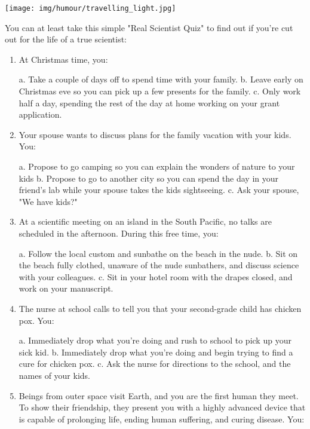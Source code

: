 	\begin{center}\underline{\hspace{5 cm}}\end{center}
		\begin{center}
		\texttt{[image: img/humour/travelling\_light.jpg]}	
	\end{center}

\pagebreak
You can at least take this simple "Real Scientist Quiz" to find out if you're cut out for the life of a true scientist:
\begin{enumerate}
	\item At Christmas time, you: 

a. Take a couple of days off to spend time with your family.
b. Leave early on Christmas eve so you can pick up a few presents for the family. 
c. Only work half a day, spending the rest of the day at home working on your grant application. 

	\item Your spouse wants to discuss plans for the family vacation with your kids. You: 

a. Propose to go camping so you can explain the wonders of nature to your kids 
b. Propose to go to another city so you can spend the day in your friend's lab while your spouse takes the kids sightseeing.
c.	Ask your spouse, "We have kids?"

	\item At a scientific meeting on an island in the South Pacific, no talks are scheduled in the afternoon. During this free time, you: 

a. Follow the local custom and sunbathe on the beach in the nude.
b. Sit on the beach fully clothed, unaware of the nude sunbathers, and discuss science with your colleagues.
c. Sit in your hotel room with the drapes closed, and work on your manuscript.

	\item The nurse at school calls to tell you that your second-grade child has chicken pox. You: 

a. Immediately drop what you're doing and rush to school to pick up your sick kid. 
b. Immediately drop what you're doing and begin trying to find a cure for chicken pox.
c. Ask the nurse for directions to the school, and the names of your kids.

	\item Beings from outer space visit Earth, and you are the first human they meet. To show their friendship, they present you with a highly advanced device that is capable of prolonging life, ending human suffering, and curing disease. You: 


\end{enumerate}
